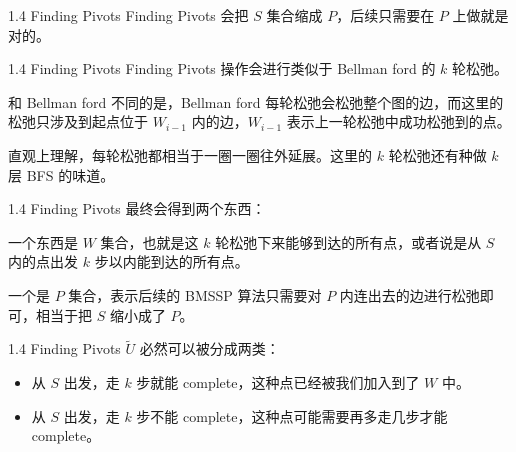 \documentclass{beamer}
\begin{document}
\begin{frame}[t]{1.4 Finding Pivots}
  Finding Pivots 会把 $S$ 集合缩成 $P$，后续只需要在 $P$ 上做就是对的。

  \pause
  \vspace{0.25em}
  \centering
\end{frame}

\begin{frame}{1.4 Finding Pivots}
  Finding Pivots 操作会进行类似于 Bellman ford 的 $k$ 轮松弛。

  \pause\vspace{0.35em}
  和 Bellman ford 不同的是，Bellman ford 每轮松弛会松弛整个图的边，而这里的松弛只涉及到起点位于 $W_{i-1}$ 内的边，$W_{i-1}$ 表示上一轮松弛中成功松弛到的点。

  \pause\vspace{0.35em}
    直观上理解，每轮松弛都相当于一圈一圈往外延展。这里的 $k$ 轮松弛还有种做 $k$ 层 BFS 的味道。
\end{frame}

\begin{frame}{1.4 Finding Pivots}
  最终会得到两个东西：

  \vspace{0.35em}
  一个东西是 $W$ 集合，也就是这 $k$ 轮松弛下来能够到达的所有点，或者说是从 $S$ 内的点出发 $k$ 步以内能到达的所有点。

  \pause\vspace{0.35em}
  一个是 $P$ 集合，表示后续的 BMSSP 算法只需要对 $P$ 内连出去的边进行松弛即可，相当于把 $S$ 缩小成了 $P$。
\end{frame}

\begin{frame}{1.4 Finding Pivots}
  $\widetilde{U} $ 必然可以被分成两类：

  \pause
  \begin{itemize}
    \item 从 $S$ 出发，走 $k$ 步就能 complete，这种点已经被我们加入到了 $W$ 中。
    
    \pause

    \item 从 $S$ 出发，走 $k$ 步不能 complete，这种点可能需要再多走几步才能 complete。
  \end{itemize}
\end{frame}
\end{document}
